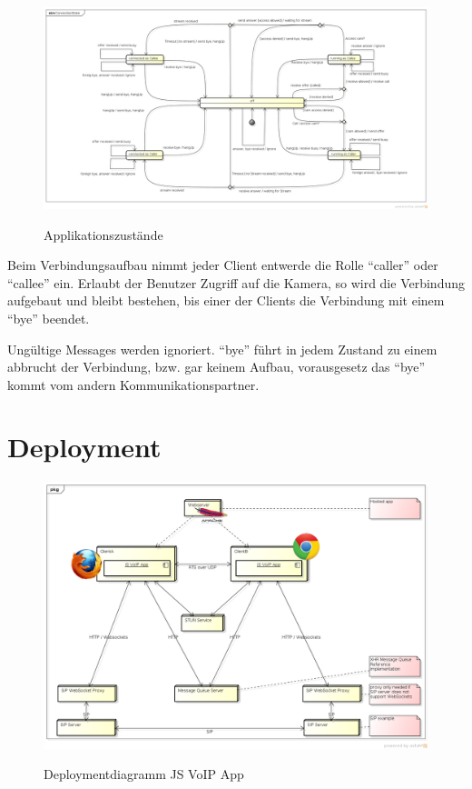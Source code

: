 	
	\begin{landscape}		
		\begin{figure}[H]
			\centering
			\includegraphics[height=0.7\textwidth]{../architekturanalayse/img/connectionState.png}
			\label{img:deployment}
			\caption{Applikationszustände}
		\end{figure}
		Beim Verbindungsaufbau nimmt jeder Client entwerde die Rolle ``caller'' oder ``callee'' ein. Erlaubt der Benutzer Zugriff auf die Kamera, so wird die Verbindung aufgebaut und bleibt bestehen, bis einer der Clients die Verbindung mit einem ``bye'' beendet.
		
		Ungültige Messages werden ignoriert. ``bye'' führt in jedem Zustand zu einem abbrucht der Verbindung, bzw. gar keinem Aufbau, vorausgesetz das ``bye'' kommt vom andern Kommunikationspartner.
	\end{landscape}
		
	
\clearpage
\section{Deployment}
	\begin{figure}[H]
		\centering
		\includegraphics[width=\textwidth]{../architekturanalayse/img/deployment.png}
		\label{img:deployment}
		\caption{Deploymentdiagramm JS VoIP App}
	\end{figure}
	